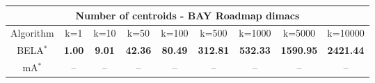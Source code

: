 \begin{tabular}{c|cccccccc}\toprule
\multicolumn{9}{c}{Number of centroids - BAY Roadmap dimacs}\\ \midrule
Algorithm & k=1 & k=10 & k=50 & k=100 & k=500 & k=1000 & k=5000 & k=10000 \\ \midrule
BELA$^*$ & \textbf{1.00} & \textbf{9.01} & \textbf{42.36} & \textbf{80.49} & \textbf{312.81} & \textbf{532.33} & \textbf{1590.95} & \textbf{2421.44} \\
mA$^*$ & -- & -- & -- & -- & -- & -- & -- & -- \\ \bottomrule 
\end{tabular}
